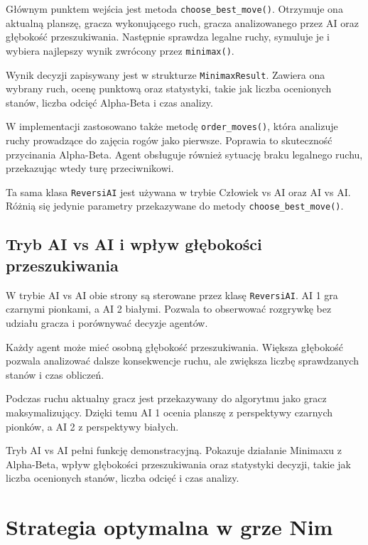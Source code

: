 Głównym punktem wejścia jest metoda \texttt{choose\_best\_move()}. Otrzymuje ona aktualną planszę, gracza wykonującego ruch, gracza analizowanego przez AI oraz głębokość przeszukiwania. Następnie sprawdza legalne ruchy, symuluje je i wybiera najlepszy wynik zwrócony przez \texttt{minimax()}.

Wynik decyzji zapisywany jest w strukturze \texttt{MinimaxResult}. Zawiera ona wybrany ruch, ocenę punktową oraz statystyki, takie jak liczba ocenionych stanów, liczba odcięć Alpha-Beta i czas analizy.

W implementacji zastosowano także metodę \texttt{order\_moves()}, która analizuje ruchy prowadzące do zajęcia rogów jako pierwsze. Poprawia to skuteczność przycinania Alpha-Beta. Agent obsługuje również sytuację braku legalnego ruchu, przekazując wtedy turę przeciwnikowi.

Ta sama klasa \texttt{ReversiAI} jest używana w trybie Człowiek vs AI oraz AI vs AI. Różnią się jedynie parametry przekazywane do metody \texttt{choose\_best\_move()}.

\subsection{Tryb AI vs AI i wpływ głębokości przeszukiwania}

W trybie AI vs AI obie strony są sterowane przez klasę \texttt{ReversiAI}. AI 1 gra czarnymi pionkami, a AI 2 białymi. Pozwala to obserwować rozgrywkę bez udziału gracza i porównywać decyzje agentów.

Każdy agent może mieć osobną głębokość przeszukiwania. Większa głębokość pozwala analizować dalsze konsekwencje ruchu, ale zwiększa liczbę sprawdzanych stanów i czas obliczeń.

Podczas ruchu aktualny gracz jest przekazywany do algorytmu jako gracz maksymalizujący. Dzięki temu AI 1 ocenia planszę z perspektywy czarnych pionków, a AI 2 z perspektywy białych.

Tryb AI vs AI pełni funkcję demonstracyjną. Pokazuje działanie Minimaxu z Alpha-Beta, wpływ głębokości przeszukiwania oraz statystyki decyzji, takie jak liczba ocenionych stanów, liczba odcięć i czas analizy.



\section{Strategia optymalna w grze Nim}


